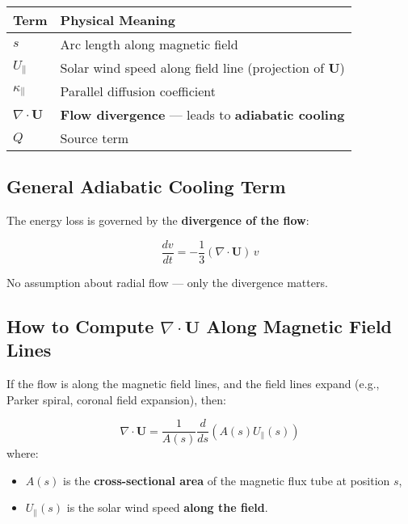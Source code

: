 \begin{center}
\begin{tabular}{@{}ll@{}}
\toprule
\textbf{Term} & \textbf{Physical Meaning} \\
\midrule
$s$ & Arc length along magnetic field \\
$U_\parallel$ & Solar wind speed along field line (projection of $\mathbf{U}$) \\
$\kappa_\parallel$ & Parallel diffusion coefficient \\
$\nabla \cdot \mathbf{U}$ & \textbf{Flow divergence} — leads to \textbf{adiabatic cooling} \\
$Q$ & Source term \\
\bottomrule
\end{tabular}
\end{center}

\hrulefill

\subsection*{ General Adiabatic Cooling Term}

The energy loss is governed by the \textbf{divergence of the flow}:

\begin{equation}
\boxed{
\frac{dv}{dt} = -\frac{1}{3} (\nabla \cdot \mathbf{U}) \, v
}
\tag{2}
\end{equation}

No assumption about radial flow — only the divergence matters.

\subsection*{ How to Compute $\nabla \cdot \mathbf{U}$ Along Magnetic Field Lines}

If the flow is along the magnetic field lines, and the field lines expand (e.g., Parker spiral, coronal field expansion), then:

\begin{equation}
\nabla \cdot \mathbf{U} = \frac{1}{A(s)} \frac{d}{ds} \left( A(s) U_\parallel(s) \right)
\tag{3}
\end{equation}
where:
\begin{itemize}
    \item $A(s)$ is the \textbf{cross-sectional area} of the magnetic flux tube at position $s$,
    \item $U_\parallel(s)$ is the solar wind speed \textbf{along the field}.
\end{itemize}

